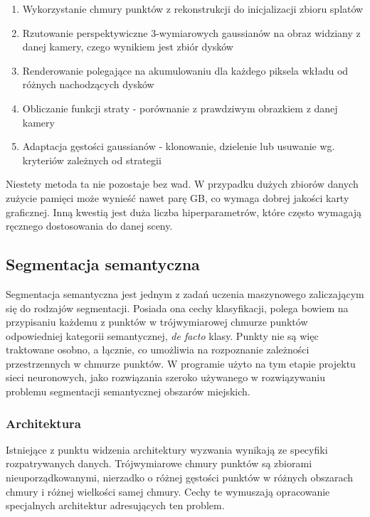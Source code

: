 \begin{enumerate}
    \item Wykorzystanie chmury punktów z rekonstrukcji do inicjalizacji zbioru splatów
    \item Rzutowanie perspektywiczne 3-wymiarowych gaussianów na obraz widziany z danej kamery, czego wynikiem jest zbiór dysków
    \item Renderowanie polegające na akumulowaniu dla każdego piksela wkładu od różnych nachodzących dysków 
    \item Obliczanie funkcji straty - porównanie z prawdziwym obrazkiem z danej kamery
    \item Adaptacja gęstości gaussianów - klonowanie, dzielenie lub usuwanie wg. kryteriów zależnych od strategii
\end{enumerate}

Niestety metoda ta nie pozostaje bez wad. W przypadku dużych zbiorów danych zużycie pamięci może wynieść nawet parę GB, co wymaga dobrej jakości karty graficznej. Inną kwestią jest duża liczba hiperparametrów, które często wymagają ręcznego dostosowania do danej sceny. 

\subsection{Segmentacja semantyczna}

Segmentacja semantyczna jest jednym z zadań uczenia maszynowego zaliczającym się do rodzajów segmentacji. Posiada ona cechy klasyfikacji, polega bowiem na przypisaniu każdemu z punktów w trójwymiarowej chmurze punktów odpowiedniej kategorii semantycznej, \textit{de facto} klasy. Punkty nie są więc traktowane osobno, a łącznie, co umożliwia na rozpoznanie zależności przestrzennych w chmurze punktów. W programie użyto na tym etapie projektu sieci neuronowych, jako rozwiązania szeroko używanego w rozwiązywaniu problemu segmentacji semantycznej obszarów miejskich.

\subsubsection{Architektura}

Istniejące z punktu widzenia architektury wyzwania wynikają ze specyfiki rozpatrywanych danych. Trójwymiarowe chmury punktów są zbiorami nieuporządkowanymi, nierzadko o różnej gęstości punktów w różnych obszarach chmury i różnej wielkości samej chmury. Cechy te wymuszają opracowanie specjalnych architektur adresujących ten problem.

